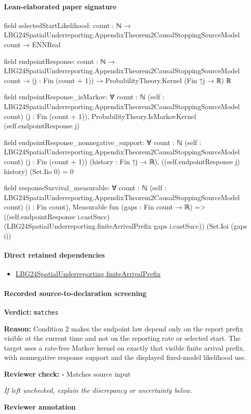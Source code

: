 \documentclass[10pt]{article}
\newcommand{\reviewerbox}{%
  \par\noindent\fbox{\parbox{0.96\linewidth}{\rule{0pt}{0.38in}}}\par
}
\newcommand{\reviewmatch}[1]{%
  \par\noindent\textbf{Reviewer check:} $\square$\; #1\par
  \noindent\emph{If left unchecked, explain the discrepancy or uncertainty below.}\par
}
\begin{document}
\paragraph{Lean-elaborated paper signature}
\begin{ReviewVerbatim}
field selectedStartLikelihood:
{count : ℕ} → LBG24SpatialUnderreporting.AppendixTheorem2CausalStoppingSourceModel count → ENNReal

field endpointResponse:
{count : ℕ} →
  LBG24SpatialUnderreporting.AppendixTheorem2CausalStoppingSourceModel count →
    (j : Fin (count + 1)) → ProbabilityTheory.Kernel (Fin ↑j → ℝ) ℝ

field endpointResponse_isMarkov:
∀ {count : ℕ} (self : LBG24SpatialUnderreporting.AppendixTheorem2CausalStoppingSourceModel count) (j : Fin (count + 1)),
  ProbabilityTheory.IsMarkovKernel (self.endpointResponse j)

field endpointResponse_nonnegative_support:
∀ {count : ℕ} (self : LBG24SpatialUnderreporting.AppendixTheorem2CausalStoppingSourceModel count) (j : Fin (count + 1))
  (history : Fin ↑j → ℝ), ((self.endpointResponse j) history) (Set.Iio 0) = 0

field responseSurvival_measurable:
∀ {count : ℕ} (self : LBG24SpatialUnderreporting.AppendixTheorem2CausalStoppingSourceModel count) (i : Fin count),
  Measurable fun (gaps : Fin count → ℝ) =>
    ((self.endpointResponse i.castSucc) (LBG24SpatialUnderreporting.finiteArrivalPrefix gaps i.castSucc))
      (Set.Ioi (gaps i))
\end{ReviewVerbatim}

\paragraph{Direct retained dependencies}
\begin{itemize}\raggedright
\item \hyperlink{governing-declaration-29c2f9ef07a8b8ce}{LBG24\allowbreak{}Spatial\allowbreak{}Underreporting.\allowbreak{}finite\allowbreak{}Arrival\allowbreak{}Prefix}
\end{itemize}
\paragraph{Recorded source-to-declaration screening}
\textbf{Verdict:} \texttt{matches}
\\
{\raggedright
\textbf{Reason:} Condition 2 makes the endpoint law depend only on the report prefix visible at the current time and not on the reporting rate or selected start.\allowbreak{} The target uses a rate-\allowbreak{}free Markov kernel on exactly that visible finite arrival prefix, with nonnegative response support and the displayed fixed-\allowbreak{}model likelihood use.\allowbreak{}
\par}
\reviewmatch{Matches source input}
\noindent\textbf{Reviewer annotation}\par
\reviewerbox
\clearpage
\hypertarget{paper-prerequisite-389857bc4c8477de}{}
\end{document}
